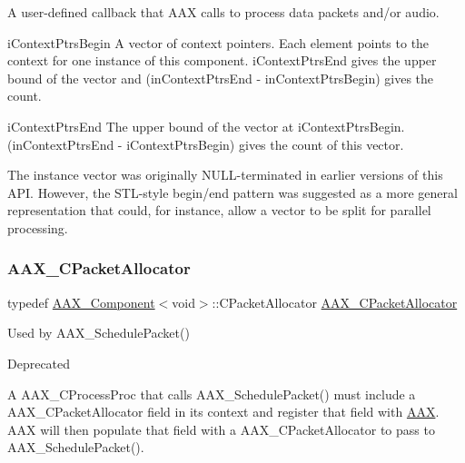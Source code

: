 A user-\/defined callback that A\+AX calls to process data packets and/or audio. 

\begin{DoxyParagraph}{i\+Context\+Ptrs\+Begin}
A vector of context pointers. Each element points to the context for one instance of this component. {\ttfamily i\+Context\+Ptrs\+End} gives the upper bound of the vector and {\ttfamily (in\+Context\+Ptrs\+End -\/ in\+Context\+Ptrs\+Begin)} gives the count.
\end{DoxyParagraph}
\begin{DoxyParagraph}{i\+Context\+Ptrs\+End}
The upper bound of the vector at {\ttfamily i\+Context\+Ptrs\+Begin}. {\ttfamily (in\+Context\+Ptrs\+End -\/ i\+Context\+Ptrs\+Begin)} gives the count of this vector.
\end{DoxyParagraph}
The instance vector was originally N\+U\+L\+L-\/terminated in earlier versions of this A\+PI. However, the S\+T\+L-\/style begin/end pattern was suggested as a more general representation that could, for instance, allow a vector to be split for parallel processing. \mbox{\label{a00401_a5c9c7cdc36d5459fa77e5dedb06d161a}} 
\subsubsection{\texorpdfstring{AAX\_CPacketAllocator}{AAX\_CPacketAllocator}}
{\footnotesize\ttfamily typedef \mbox{\hyperlink{a01437}{A\+A\+X\+\_\+\+Component}}$<$void$>$\+::C\+Packet\+Allocator \mbox{\hyperlink{a00401_a5c9c7cdc36d5459fa77e5dedb06d161a}{A\+A\+X\+\_\+\+C\+Packet\+Allocator}}}



Used by A\+A\+X\+\_\+\+Schedule\+Packet() 

\begin{DoxyRefDesc}{Deprecated}
\item[\mbox{\hyperlink{a00788__deprecated000002}{Deprecated}}]\end{DoxyRefDesc}


A A\+A\+X\+\_\+\+C\+Process\+Proc that calls A\+A\+X\+\_\+\+Schedule\+Packet() must include a A\+A\+X\+\_\+\+C\+Packet\+Allocator field in its context and register that field with \mbox{\hyperlink{a00852}{A\+AX}}. A\+AX will then populate that field with a A\+A\+X\+\_\+\+C\+Packet\+Allocator to pass to A\+A\+X\+\_\+\+Schedule\+Packet().

